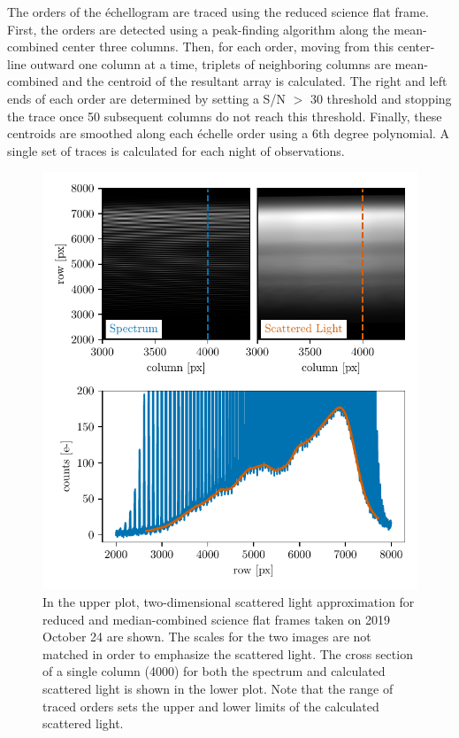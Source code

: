 The orders of the \'echellogram are traced using the reduced science flat frame. First, the orders are detected using a peak-finding algorithm along the mean-combined center three columns. Then, for each order, moving from this center-line outward one column at a time, triplets of neighboring columns are mean-combined and the centroid of the resultant array is calculated. The right and left ends of each order are determined by setting a S/N $>$ 30 threshold and stopping the trace once 50 subsequent columns do not reach this threshold. Finally, these centroids are smoothed along each \'echelle order using a 6th degree polynomial. A single set of traces is calculated for each night of observations.

\begin{figure}
    \centering
    \includegraphics{figures-4/scat_light.pdf}
    \caption[EXPRES scattered light approximation]{In the upper plot, two-dimensional scattered light approximation for reduced and median-combined science flat frames taken on 2019 October 24 are shown. The scales for the two images are not matched in order to emphasize the scattered light. The cross section of a single column (4000) for both the spectrum and calculated scattered light is shown in the lower plot. Note that the range of traced orders sets the upper and lower limits of the calculated scattered light.}
    \label{fig:scattered_light}
\end{figure}

